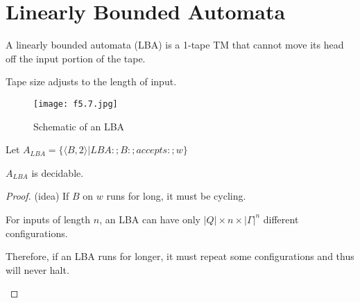 \section{Linearly Bounded Automata}

\begin{definition}
A linearly bounded automata (LBA) is a 1-tape TM that cannot move its head off the input portion of the tape.
\end{definition}

\begin{remark}
    Tape size adjusts to the length of input.
\end{remark}

\begin{figure}[H]
    \centering
    \texttt{[image: f5.7.jpg]}
    \caption{Schematic of an LBA}
\end{figure}

\begin{theorem}
    Let \(A_{LBA} = \{ \langle B, 2 \rangle | LBA:; B :; accepts :; w\} \) 

    \(A_{LBA}\) is decidable. 
\end{theorem}
\begin{proof}
    (idea) If \(B\) on \(w\) runs for long, it must be cycling. 

    \begin{remark}
        For inputs of length \(n\), an LBA  can have only \(|Q| \times n \times |\Gamma|^n\) different configurations. 

        Therefore, if an LBA runs for longer, it must repeat some configurations and thus will never halt.
    \end{remark}
\end{proof}

